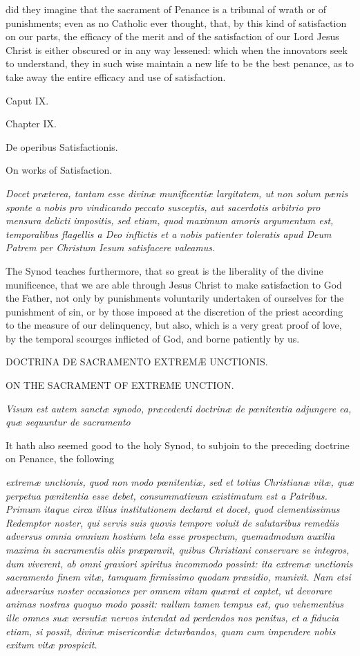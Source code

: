did they imagine that the sacrament of Penance is a tribunal of wrath or of punishments; even as no Catholic ever thought, that, by this kind of satisfaction on our parts, the efficacy of the merit and of the satisfaction of our Lord Jesus Christ is either obscured or in any way lessened: which when the innovators seek to understand, they in such wise maintain a new life to be the best penance, as to take away the entire efficacy and use of satisfaction.

Caput IX.

Chapter IX.

De operibus Satisfactionis.

On works of Satisfaction.

\emph{Docet præterea, tantam esse divinæ munificentiæ largitatem, ut non solum pænis sponte a nobis pro vindicando peccato susceptis, aut sacerdotis arbitrio pro mensura delicti impositis, sed etiam, quod maximum amoris argumentum est, temporalibus flagellis a Deo inflictis et a nobis patienter toleratis apud Deum Patrem per Christum Iesum satisfacere valeamus.}

The Synod teaches furthermore, that so great is the liberality of the divine munificence, that we are able through Jesus Christ to make satisfaction to God the Father, not only by punishments voluntarily undertaken of ourselves for the punishment of sin, or by those imposed at the discretion of the priest according to the measure of our delinquency, but also, which is a very great proof of love, by the temporal scourges inflicted of God, and borne patiently by us.

DOCTRINA DE SACRAMENTO EXTREMÆ UNCTIONIS.

ON THE SACRAMENT OF EXTREME UNCTION.

\emph{Visum est autem sanctæ synodo, præcedenti doctrinæ de pœnitentia adjungere ea, quæ sequuntur de sacramento }

It hath also seemed good to the holy Synod, to subjoin to the preceding doctrine on Penance, the following

\emph{extremæ unctionis, quod non modo pœnitentiæ, sed et totius Christianæ vitæ, quæ perpetua pœnitentia esse debet, consummativum existimatum est a Patribus. Primum itaque circa illius institutionem declarat et docet, quod clementissimus Redemptor noster, qui servis suis quovis tempore voluit de salutaribus remediis adversus omnia omnium hostium tela esse prospectum, quemadmodum auxilia maxima in sacramentis aliis præparavit, quibus Christiani conservare se integros, dum viverent, ab omni graviori spiritus incommodo possint: ita extremæ unctionis sacramento finem vitæ, tamquam firmissimo quodam præsidio, munivit. Nam etsi adversarius noster occasiones per omnem vitam quærat et captet, ut devorare animas nostras quoquo modo possit: nullum tamen tempus est, quo vehementius ille omnes suæ versutiæ nervos intendat ad perdendos nos penitus, et a fiducia etiam, si possit, divinæ misericordiæ deturbandos, quam cum impendere nobis exitum vitæ prospicit.}

